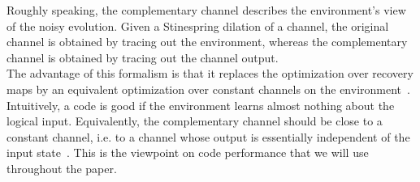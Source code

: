 \documentclass[10pt,twocolumn,superscriptaddress,aps,amsmath,amssymb,citeautoscript,floatfix,prx,longbibliography]{revtex4-2}
\theoremstyle{plain}
\theoremstyle{plain}
\theoremstyle{plain}
\theoremstyle{plain}
\theoremstyle{plain}
\theoremstyle{plain}
\begin{document}
{Roughly speaking, the complementary channel describes the environment's view of the noisy evolution. Given a Stinespring dilation of a channel, the original channel is obtained by tracing out the environment, whereas the complementary channel is obtained by tracing out the channel output.\\
The advantage of this formalism is that it replaces the optimization over recovery maps by an equivalent optimization over constant channels on the environment~\cite{Beny2010}. Intuitively, a code is good if the environment learns almost nothing about the logical input. Equivalently, the complementary channel should be close to a constant channel, i.e. to a channel whose output is essentially independent of the input state~\cite{Faist2020}. This is the viewpoint on code performance that we will use throughout the paper.}
\end{document}
